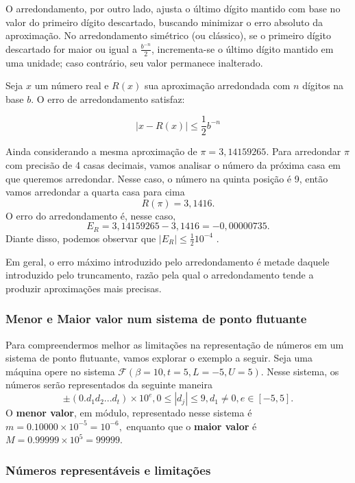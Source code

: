 O arredondamento, por outro lado, ajusta o último dígito mantido com base no
valor do primeiro dígito descartado, buscando minimizar o erro absoluto da
aproximação. No arredondamento simétrico (ou clássico), se o primeiro dígito
descartado for maior ou igual a \( \frac{b^{-n}}{2} \), incrementa-se o último
dígito mantido em uma unidade; caso contrário, seu valor permanece inalterado.

Seja \( x \) um número real e \( R(x) \) sua aproximação arredondada com \( n
\) dígitos na base \( b \). O erro de arredondamento satisfaz:

\[
  |x - R(x)| \leq \frac{1}{2} b^{-n}
\]

\begin{ex}
  Ainda considerando a mesma aproximação de \(\pi = 3,14159265\).
  Para arredondar $\pi$  com precisão de 4 casas decimais, vamos analisar o número da próxima casa em que queremos arredondar. Nesse caso, o número na quinta posição é 9, então vamos arredondar a quarta casa para cima
  $$R(\pi) = 3,1416.$$
  O erro do arredondamento é, nesse caso, $$E_R = 3,14159265 - 3,1416  = -0,00000735.$$
  Diante disso, podemos observar que $|E_R| \leq  \frac{ 1}{2}10^{-4}$ . %
\end{ex}

Em geral, o erro máximo introduzido pelo arredondamento é metade daquele
introduzido pelo truncamento, razão pela qual o arredondamento tende a produzir
aproximações mais precisas.

\subsubsection*{Menor e Maior valor num sistema de ponto flutuante}

Para compreendermos melhor as limitações na representação de números em um
sistema de ponto flutuante, vamos explorar o exemplo a seguir. Seja uma máquina
opere no sistema $\mathcal{F}(\beta=10, t=5, L=-5, U=5)$. Nesse sistema, os
números serão representados da seguinte maneira
\begin{equation*}
  \pm (0.d_{1}d_{2} . . . d_{t}) \times 10^e,  0 \leq |d_{j}| \leq 9,  d_{1} \neq 0, e \in [-5,5].
\end{equation*}
O \textbf{menor valor}, em módulo, representado nesse sistema é
$  m = 0.10000 \times 10^{-5} = 10^{-6},$ enquanto que o \textbf{maior valor} é $M = 0.99999 \times 10^{5} = 99999$.

\subsubsection*{Números representáveis e limitações}

